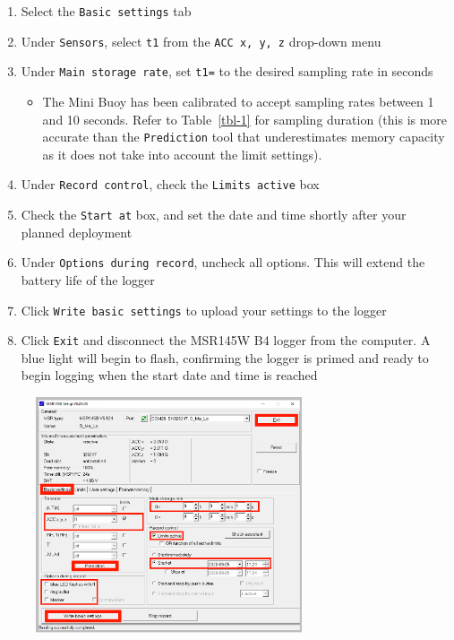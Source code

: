 \documentclass[
  letterpaper,
  DIV=11,
  numbers=noendperiod]{scrreprt}
\providecommand{\tightlist}{%
  \setlength{\itemsep}{0pt}\setlength{\parskip}{0pt}}\usepackage{longtable,booktabs,array}
\begin{document}
\begin{enumerate}
\def\labelenumi{\arabic{enumi}.}
\setcounter{enumi}{16}
\tightlist
\item
  Select the \texttt{Basic\ settings} tab
\item
  Under \texttt{Sensors}, select \texttt{t1} from the
  \texttt{ACC\ x,\ y,\ z} drop-down menu
\item
  Under \texttt{Main\ storage\ rate}, set \texttt{t1=} to the desired
  sampling rate in seconds

  \begin{itemize}
  \tightlist
  \item
    The Mini Buoy has been calibrated to accept sampling rates between 1
    and 10 seconds. Refer to Table~\ref{tbl-1} for sampling duration
    (this is more accurate than the \texttt{Prediction} tool that
    underestimates memory capacity as it does not take into account the
    limit settings).
  \end{itemize}
\item
  Under \texttt{Record\ control}, check the \texttt{Limits\ active} box
\item
  Check the \texttt{Start\ at} box, and set the date and time shortly
  after your planned deployment
\item
  Under \texttt{Options\ during\ record}, uncheck all options. This will
  extend the battery life of the logger
\item
  Click \texttt{Write\ basic\ settings} to upload your settings to the
  logger
\item
  Click \texttt{Exit} and disconnect the MSR145W B4 logger from the
  computer. A blue light will begin to flash, confirming the logger is
  primed and ready to begin logging when the start date and time is
  reached
\end{enumerate}

\begin{figure}

{\centering \includegraphics[width=0.7\textwidth,height=\textheight]{chapters/figs/MSRStep5.png}

}

\end{figure}
\end{document}
